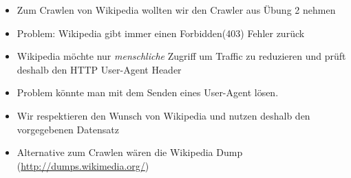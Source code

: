\begin{frame}[c]
\begin{itemize}
  \item Zum Crawlen von Wikipedia wollten wir den Crawler aus Übung 2 nehmen
  \item Problem: Wikipedia gibt immer einen Forbidden(403) Fehler zurück
  \item Wikipedia möchte nur \textit{menschliche} Zugriff um Traffic zu reduzieren und prüft deshalb den HTTP User-Agent Header
  \item Problem könnte man mit dem Senden eines User-Agent lösen.
  \item Wir respektieren den Wunsch von Wikipedia und nutzen deshalb den vorgegebenen Datensatz
  \item Alternative zum Crawlen wären die Wikipedia Dump (\url{http://dumps.wikimedia.org/})
\end{itemize}
\end{frame}